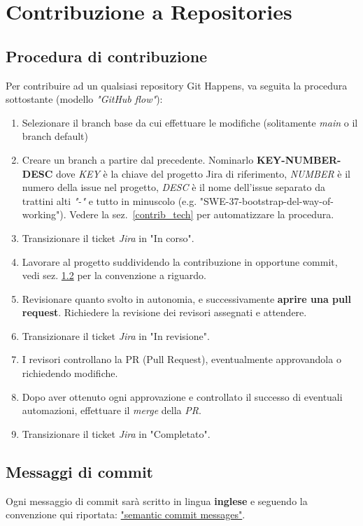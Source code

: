
\section{Contribuzione a Repositories}

\subsection{Procedura di contribuzione}\label{mainsec:contrib}
Per contribuire ad un qualsiasi repository Git Happens, va seguita la procedura sottostante (modello \textit{"GitHub flow"}):
\begin{enumerate}
    \item Selezionare il branch base da cui effettuare le modifiche (solitamente \textit{main} o il branch default)
    \item Creare un branch a partire dal precedente. Nominarlo \textbf{KEY-NUMBER-DESC} dove
          \textit{KEY} è la chiave del progetto Jira di riferimento, \textit{NUMBER} è il numero della issue nel
          progetto, \textit{DESC} è il nome dell'issue separato da trattini alti \textit{"-"} e tutto in minuscolo (e.g. "SWE-37-bootstrap-del-way-of-working"). Vedere la sez.~\ref{contrib_tech} per automatizzare la procedura.
    \item Transizionare il ticket \textit{Jira} in "In corso".
    \item Lavorare al progetto suddividendo la contribuzione in opportune commit, vedi sez. \ref{contrib_sem_commit_scopes} per la convenzione a riguardo.
    \item Revisionare quanto svolto in autonomia, e successivamente \textbf{aprire una pull request}. Richiedere la revisione dei revisori assegnati e attendere.
    \item Transizionare il ticket \textit{Jira} in "In revisione".
    \item I revisori controllano la PR (Pull Request), eventualmente approvandola o richiedendo modifiche.
    \item Dopo aver ottenuto ogni approvazione e controllato il successo di eventuali automazioni, effettuare il \textit{merge} della \textit{PR}.
    \item Transizionare il ticket \textit{Jira} in "Completato".
\end{enumerate}

\subsection{Messaggi di commit}\label{contrib_sem_commit_scopes}
Ogni messaggio di commit sarà scritto in lingua \textbf{inglese} e seguendo la convenzione qui riportata: \href{https://gist.github.com/joshbuchea/6f47e86d2510bce28f8e7f42ae84c716}{"semantic commit messages"}.

